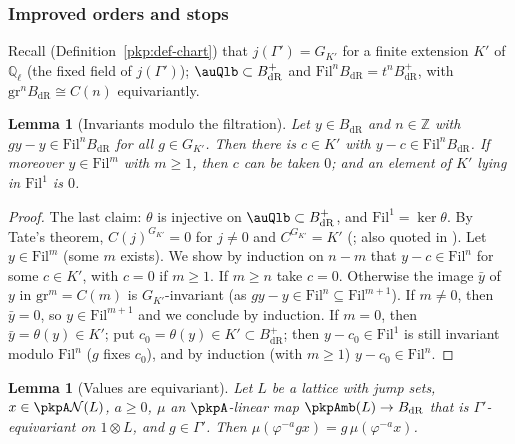 \documentclass[10pt]{amsart}
\newtheorem{lemma}[theorem]{Lemma}
\theoremstyle{definition}
\theoremstyle{remark}
\newcommand{\Z}{\mathbb Z}
\newcommand{\Q}{\mathbb Q}
\begin{document}
\subsubsection{Improved orders and stops}\label{pkm:ss-stops}

Recall (Definition~\ref{pkp:def-chart}) that $j(\Gamma')=G_{K'}$ for a finite extension $K'$ of
$\Q_\ell$ (the fixed field of $j(\Gamma')$); $\auQlb\subset B^+_{\mathrm{dR}}$ and $\mathrm{Fil}^n
B_{\mathrm{dR}}=t^nB^+_{\mathrm{dR}}$, with $\mathrm{gr}^nB_{\mathrm{dR}}\cong C(n)$ equivariantly.

\begin{lemma}[Invariants modulo the filtration]\label{pkm:BdR}
Let $y\in B_{\mathrm{dR}}$ and $n\in\Z$ with $gy-y\in\mathrm{Fil}^nB_{\mathrm{dR}}$ for all $g\in G_{K'}$.
Then there is $c\in K'$ with $y-c\in\mathrm{Fil}^nB_{\mathrm{dR}}$. If moreover $y\in\mathrm{Fil}^m$
with $m\ge1$, then $c$ can be taken $0$; and an element of $K'$ lying in $\mathrm{Fil}^1$ is $0$.
\end{lemma}

\begin{proof}
The last claim: $\theta$ is injective on $\auQlb\subset B^+_{\mathrm{dR}}$, and $\mathrm{Fil}^1=\ker\theta$.
By Tate's theorem, $C(j)^{G_{K'}}=0$ for $j\ne0$ and $C^{G_{K'}}=K'$ (\cite[\S3, Theorems~1 and~2, p.~176]{pklTate67}; also quoted in \cite[1.5.7]{pkfFontaineII}). Let $y\in\mathrm{Fil}^m$ (some $m$ exists). We show by induction
on $n-m$ that $y-c\in\mathrm{Fil}^n$ for some $c\in K'$, with $c=0$ if $m\ge1$. If $m\ge n$ take
$c=0$. Otherwise the image $\bar y$ of $y$ in $\mathrm{gr}^m=C(m)$ is $G_{K'}$-invariant (as
$gy-y\in\mathrm{Fil}^n\subseteq\mathrm{Fil}^{m+1}$). If $m\ne0$, then $\bar y=0$, so $y\in\mathrm{Fil}^{m+1}$
and we conclude by induction. If $m=0$, then $\bar y=\theta(y)\in K'$; put $c_0=\theta(y)\in K'\subset
B^+_{\mathrm{dR}}$; then $y-c_0\in\mathrm{Fil}^1$ is still invariant modulo $\mathrm{Fil}^n$ ($g$ fixes
$c_0$), and by induction (with $m\ge1$) $y-c_0\in\mathrm{Fil}^n$.
\end{proof}

\begin{lemma}[Values are equivariant]\label{pkm:equiv}
Let $L$ be a lattice with jump sets, $x\in\pkpA\mathcal N(L)$, $a\ge0$, $\mu$ an $\pkpA$-linear map
$\pkpAmb(L)\to B_{\mathrm{dR}}$ that is $\Gamma'$-equivariant on $1\otimes L$, and $g\in\Gamma'$. Then
$\mu(\varphi^{-a}gx)=g\,\mu(\varphi^{-a}x)$.
\end{lemma}
\end{document}

